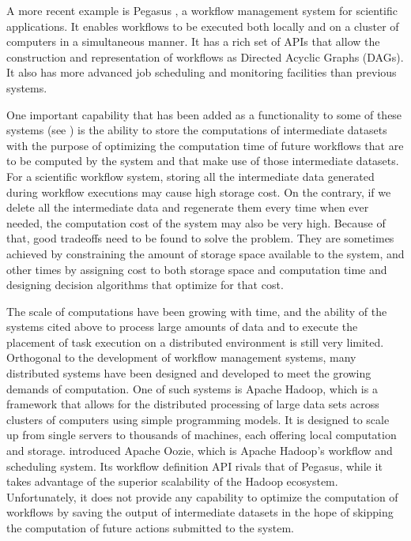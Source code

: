 A more recent example is Pegasus \citep{singh2008workflow}, a workflow management system for scientific applications.  It enables workflows to be executed both locally and on a cluster of computers in a simultaneous manner.  It has a rich set of APIs that allow the construction and representation of workflows as Directed Acyclic Graphs (DAGs).  It also has more advanced job scheduling and monitoring facilities than previous systems.  

One important capability that has been added as a functionality to some of these systems (see \cite{yuan2012data}) is the ability to store the computations of intermediate datasets with the purpose of optimizing the computation time of future workflows that are to be computed by the system and that make use of those intermediate datasets. For a scientific workflow system, storing all the intermediate data generated during workflow executions may cause high storage cost.  On the contrary, if we delete all the intermediate data and regenerate them every time when ever needed, the computation cost of the system may also be very high. Because of that, good tradeoffs need to be found to solve the problem.  They are sometimes achieved by constraining the amount of storage space available to the system, and other times by assigning cost to both storage space and computation time and designing decision algorithms that optimize for that cost. 

The scale of computations have been growing with time, and the ability of the systems cited above to process large amounts of data and to execute the placement of task execution on a distributed environment is still very limited.  Orthogonal to the development of workflow management systems, many distributed systems have been designed and developed to meet the growing demands of computation.  One of such systems is Apache Hadoop, which is a framework that allows for the distributed processing of large data sets across clusters of computers using simple programming models. It is designed to scale up from single servers to thousands of machines, each offering local computation and storage. \cite{islam2012oozie} introduced Apache Oozie, which is Apache Hadoop's workflow and scheduling system.  Its workflow definition API rivals that of Pegasus, while it takes advantage of the superior scalability of the Hadoop ecosystem. Unfortunately, it does not provide any capability to optimize the computation of workflows by saving the output of intermediate datasets in the hope of skipping the computation of future actions submitted to the system.

